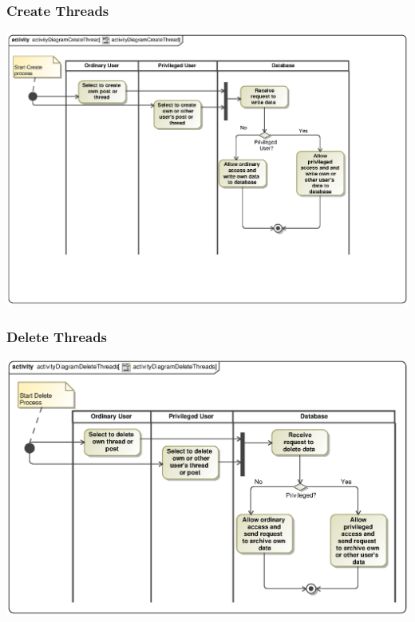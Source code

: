 \documentclass[hidelinks, 12pt, oneside]{article}
\begin{document}
\subsubsection{Create Threads}
\includegraphics[scale=.9]{Renaldo/activityDiagramCreateThread.eps}\\

\subsubsection{Delete Threads}
\includegraphics[scale=.9]{Renaldo/activityDiagramDeleteThreads.eps}\\
\end{document}

